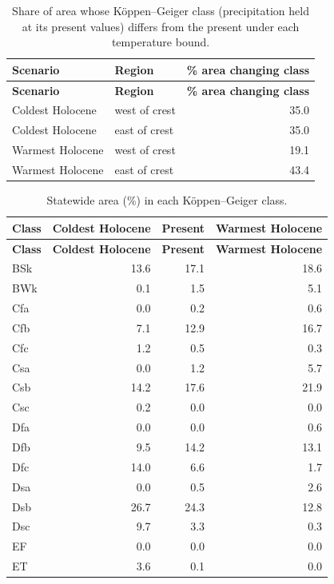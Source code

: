 {\small
\begin{longtable}{llr}
\caption{Share of area whose K\"{o}ppen--Geiger class (precipitation held at its present values) differs from the present under each temperature bound.}\label{tab:koppen}\\
\toprule
\textbf{Scenario} & \textbf{Region} & \textbf{\% area changing class} \\
\midrule
\endfirsthead
\toprule
\textbf{Scenario} & \textbf{Region} & \textbf{\% area changing class} \\
\midrule
\endhead
\bottomrule
\endfoot
Coldest Holocene & west of crest & 35.0 \\
Coldest Holocene & east of crest & 35.0 \\
Warmest Holocene & west of crest & 19.1 \\
Warmest Holocene & east of crest & 43.4 \\
\end{longtable}
}
{\small
\begin{longtable}{lrrr}
\caption{Statewide area (\%) in each K\"{o}ppen--Geiger class.}\label{tab:koppenarea}\\
\toprule
\textbf{Class} & \textbf{Coldest Holocene} & \textbf{Present} & \textbf{Warmest Holocene} \\
\midrule
\endfirsthead
\toprule
\textbf{Class} & \textbf{Coldest Holocene} & \textbf{Present} & \textbf{Warmest Holocene} \\
\midrule
\endhead
\bottomrule
\endfoot
BSk & 13.6 & 17.1 & 18.6 \\
BWk & 0.1 & 1.5 & 5.1 \\
Cfa & 0.0 & 0.2 & 0.6 \\
Cfb & 7.1 & 12.9 & 16.7 \\
Cfc & 1.2 & 0.5 & 0.3 \\
Csa & 0.0 & 1.2 & 5.7 \\
Csb & 14.2 & 17.6 & 21.9 \\
Csc & 0.2 & 0.0 & 0.0 \\
Dfa & 0.0 & 0.0 & 0.6 \\
Dfb & 9.5 & 14.2 & 13.1 \\
Dfc & 14.0 & 6.6 & 1.7 \\
Dsa & 0.0 & 0.5 & 2.6 \\
Dsb & 26.7 & 24.3 & 12.8 \\
Dsc & 9.7 & 3.3 & 0.3 \\
EF & 0.0 & 0.0 & 0.0 \\
ET & 3.6 & 0.1 & 0.0 \\
\end{longtable}
}
